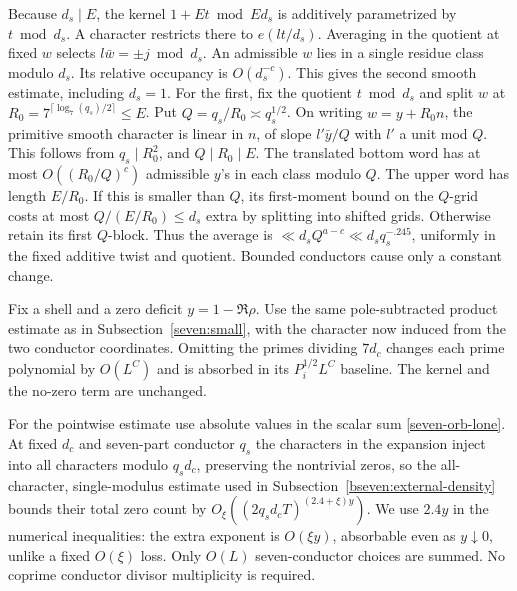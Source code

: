 \documentclass[11pt,a4paper]{article}
\theoremstyle{paperplain}
\numberwithin{equation}{section}
\begin{document}
Because \(d_s\mid E\), the kernel \(1+E t\bmod Ed_s\) is
additively parametrized by \(t\bmod d_s\). A character restricts
there to \(e(l t/d_s)\). Averaging in the quotient at fixed \(w\)
selects \(l\bar w=\pm j\bmod d_s\). An admissible \(w\) lies in a
single residue class modulo \(d_s\). Its relative occupancy is
\(O(d_s^{-c})\). This gives the second smooth estimate, including
\(d_s=1\). For the first, fix the quotient \(t\bmod d_s\) and
split \(w\) at \(R_0=7^{\lceil\log_7(q_s)/2\rceil}\le E\).
Put \(Q=q_s/R_0\asymp q_s^{1/2}\). On writing \(w=y+R_0n\), the
primitive smooth character is linear in \(n\), of slope
\(l'\bar y/Q\) with \(l'\) a unit mod \(Q\). This follows from
\(q_s\mid R_0^2\), and \(Q\mid R_0\mid E\).
The translated bottom word has at most \(O((R_0/Q)^c)\) admissible
\(y\)'s in each class modulo \(Q\). The upper word has length
\(E/R_0\). If this is smaller than \(Q\), its first-moment bound
on the \(Q\)-grid costs at most \(Q/(E/R_0)\le d_s\) extra by
splitting into shifted grids. Otherwise retain its first \(Q\)-block.
Thus the average is \(\ll d_s Q^{a-c}\ll d_s q_s^{-.245}\),
uniformly in the fixed additive twist and quotient. Bounded
conductors cause only a constant change.

Fix a shell and a zero deficit \(y=1-\Re\rho\).
Use the same pole-subtracted product estimate as in
Subsection~\ref{seven:small}, with the character now induced from
the two conductor coordinates. Omitting the primes dividing $7d_c$
changes each prime polynomial by $O(L^C)$ and is absorbed in its
$P_i^{1/2}L^C$ baseline. The kernel and the no-zero term are unchanged.

For the pointwise estimate use absolute values in the scalar sum
\eqref{seven-orb-lone}. At fixed \(d_c\) and seven-part conductor
\(q_s\) the characters in the expansion inject into all characters
modulo \(q_sd_c\), preserving the nontrivial zeros, so the all-character, single-modulus estimate used in
Subsection~\ref{bseven:external-density} bounds their total zero count
by $O_\xi((2q_s d_c T)^{(2.4+\xi)y})$. We use $2.4y$ in the numerical
inequalities: the extra exponent is $O(\xi y)$, absorbable even as
$y\downarrow0$, unlike a fixed $O(\xi)$ loss. Only
\(O(L)\) seven-conductor choices are summed. No coprime conductor
divisor multiplicity is required.
\end{document}
